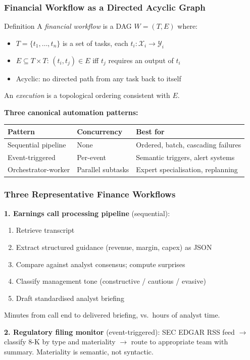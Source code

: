 \documentclass[9pt,t]{beamer}
\begin{document}
\begin{frame}
\frametitle{Financial Workflow as a Directed Acyclic Graph}

\begin{block}{Definition}
  A \emph{financial workflow} is a DAG $W = (T, E)$ where:
  \begin{itemize}
    \item $T = \{t_1, \ldots, t_n\}$ is a set of tasks, each $t_i : \mathcal{X}_i \to \mathcal{Y}_i$
    \item $E \subseteq T \times T$: $(t_i, t_j) \in E$ iff $t_j$ requires an output of $t_i$
    \item Acyclic: no directed path from any task back to itself
  \end{itemize}
  An \emph{execution} is a topological ordering consistent with $E$.
\end{block}

\medskip
\textbf{Three canonical automation patterns:}
\begin{center}
\begin{tabular}{lll}
\toprule
\textbf{Pattern} & \textbf{Concurrency} & \textbf{Best for} \\
\midrule
Sequential pipeline & None & Ordered, batch, cascading failures \\
Event-triggered & Per-event & Semantic triggers, alert systems \\
Orchestrator-worker & Parallel subtasks & Expert specialisation, replanning \\
\bottomrule
\end{tabular}
\end{center}
\end{frame}

\begin{frame}
\frametitle{Three Representative Finance Workflows}

\textbf{1. Earnings call processing pipeline} (sequential):
\begin{enumerate}\small
  \item Retrieve transcript
  \item Extract structured guidance (revenue, margin, capex) as JSON
  \item Compare against analyst consensus; compute surprises
  \item Classify management tone (constructive / cautious / evasive)
  \item Draft standardised analyst briefing
\end{enumerate}
Minutes from call end to delivered briefing, vs.\ hours of analyst time.

\medskip
\textbf{2. Regulatory filing monitor} (event-triggered):
SEC EDGAR RSS feed $\to$ classify 8-K by type and materiality $\to$ route to appropriate team with summary. Materiality is semantic, not syntactic.
\end{frame}
\end{document}

